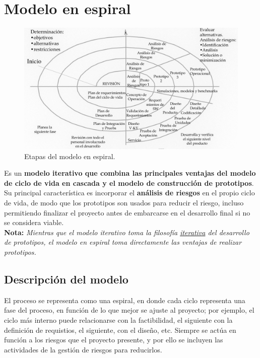 \section{Modelo en espiral}

\begin{figure}[H]
   \centering
   \includegraphics[width=0.9\linewidth]{Resources/Tema3/modeloEspiral.png}
   \caption{Etapas del modelo en espiral.}
   \label{fig:modeloEspiral}
\end{figure}

Es un \textbf{modelo iterativo que combina las principales ventajas del modelo de ciclo de vida en cascada y el modelo de construcción de prototipos}. Su principal característica es incorporar el \textbf{análisis de riesgos} en el propio ciclo de vida, de modo que los prototipos son usados para reducir el riesgo, incluso permitiendo finalizar el proyecto antes de embarcarse en el desarrollo final si no se considera viable.\\

\textbf{Nota:} \textit{Mientras que el modelo iterativo toma la filosofía \uline{iterativa} del desarrollo de prototipos, el modelo en espiral toma directamente las ventajas de realizar prototipos.}


\subsection{Descripción del modelo}

El proceso se representa como una espiral, en donde cada ciclo representa una fase del proceso, en función de lo que mejor se ajuste al proyecto; por ejemplo, el ciclo más interno puede relacionarse con la factibilidad, el siguiente con la definición de requistios, el siguiente, con el diseño, etc. Siempre se actúa en función a los riesgos que el proyecto presente, y por ello se incluyen las actividades de la gestión de riesgos para reducirlos.

